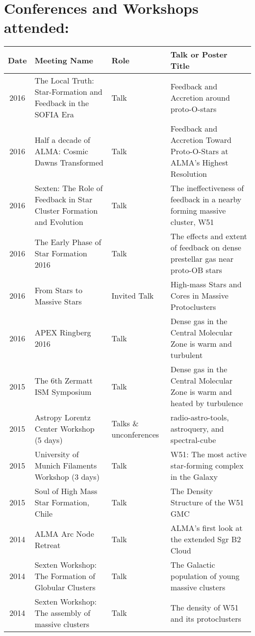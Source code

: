 \setlength{\extrarowheight}{4pt}
\section*{Conferences and Workshops attended: }
\vspace{-12pt}
\begin{tabular}{cp{1.8in}p{1.5cm}p{3.0in}}
    Date & Meeting Name & Role & Talk or Poster Title \\
                \hline
    2016 &      The Local Truth: Star-Formation and Feedback in the SOFIA Era & Talk & Feedback and Accretion around proto-O-stars \\
    2016 &      Half a decade of ALMA: Cosmic Dawns Transformed & Talk & Feedback and Accretion Toward Proto-O-Stars at ALMA's Highest Resolution \\
    2016 &      Sexten: The Role of Feedback in Star Cluster Formation and Evolution  & Talk & The ineffectiveness of feedback in a nearby forming massive cluster, W51 \\
    2016 &      The Early Phase of Star Formation 2016 & Talk & The effects and extent of feedback on dense prestellar gas near proto-OB stars \\
    2016 &      From Stars to Massive Stars & Invited Talk & High-mass Stars and Cores in Massive Protoclusters \\
    2016 &      APEX Ringberg 2016 & Talk & Dense gas in the Central Molecular Zone is warm and turbulent \\
    2015 &      The 6th Zermatt ISM Symposium & Talk & Dense gas in the Central Molecular Zone is warm and heated by turbulence \\
    2015 &      Astropy Lorentz Center Workshop (5 days) & Talks \& unconferences & radio-astro-tools, astroquery, and spectral-cube \\ 
    2015 &      University of Munich Filaments Workshop (3 days) & Talk & W51: The most active star-forming complex in the Galaxy \\
    2015 &      Soul of High Mass Star Formation, Chile & Talk & The Density Structure of the W51 GMC \\
    2014 &      ALMA Arc Node Retreat  & Talk & ALMA's first look at the extended Sgr B2 Cloud \\
    2014 &      Sexten Workshop: The Formation of Globular Clusters  & Talk & The Galactic population of young massive clusters \\
    2014 &      Sexten Workshop: The assembly of massive clusters  & Talk & The density of W51 and its protoclusters \\

\end{tabular}
